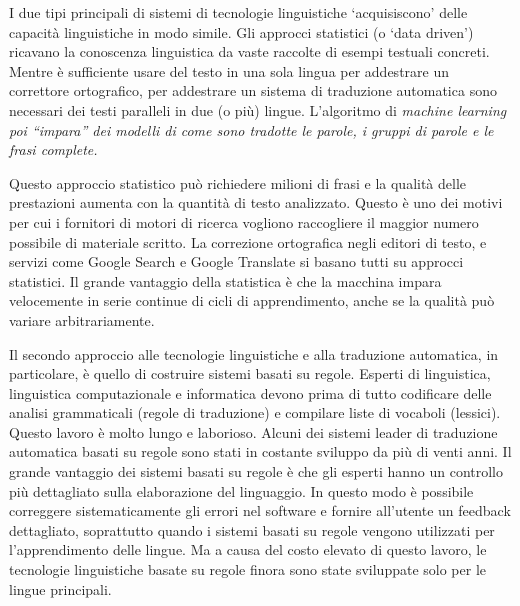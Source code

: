 \documentclass[]{../../metanetpaper}
\begin{document}
\begin{multicols}{2}

I due tipi principali di sistemi di tecnologie linguistiche ‘acquisiscono’
delle capacit\`{a} linguistiche in modo simile. Gli approcci statistici
(o ‘data driven’) ricavano la conoscenza linguistica da vaste raccolte di
esempi testuali concreti. Mentre \`{e} sufficiente usare del testo in una sola
lingua per addestrare un correttore ortografico, per addestrare un
sistema di traduzione automatica sono necessari dei testi paralleli in due (o
pi\`{u}) lingue. L'algoritmo di \it{machine learning} poi “impara” dei modelli di
come sono tradotte le parole, i gruppi di parole e le frasi complete.


Questo approccio statistico pu\`{o} richiedere milioni di frasi e la
qualit\`{a} delle prestazioni aumenta con la quantit\`{a} di testo
analizzato. Questo \`{e} uno dei motivi per cui i fornitori di motori di
ricerca vogliono raccogliere il maggior numero possibile di materiale
scritto. La correzione ortografica negli editori di testo, e servizi come
Google Search e Google Translate si basano tutti su approcci
statistici. Il grande vantaggio della statistica \`{e} che la macchina impara
velocemente in serie continue di cicli di apprendimento, anche se la
qualit\`{a} pu\`{o} variare arbitrariamente.


Il secondo approccio alle tecnologie linguistiche e alla traduzione
automatica, in particolare, \`{e} quello di costruire sistemi basati su
regole. Esperti di linguistica, linguistica computazionale e informatica
devono prima di tutto codificare delle analisi grammaticali (regole di
traduzione) e compilare liste di vocaboli (lessici). Questo lavoro \`{e} molto
lungo e laborioso. Alcuni dei sistemi leader di traduzione automatica basati
su regole sono stati in costante sviluppo da pi\`{u} di venti anni. Il grande
vantaggio dei sistemi basati su regole \`{e} che gli esperti hanno un controllo
pi\`{u} dettagliato sulla elaborazione del linguaggio. In questo modo \`{e}
possibile correggere sistematicamente gli errori nel software e fornire
all'utente un feedback dettagliato, soprattutto quando i sistemi basati su
regole vengono utilizzati per l'apprendimento delle lingue. Ma a causa del
costo elevato di questo lavoro, le tecnologie linguistiche basate su regole
finora sono state sviluppate solo per le lingue principali.



\end{multicols}
\end{document}
